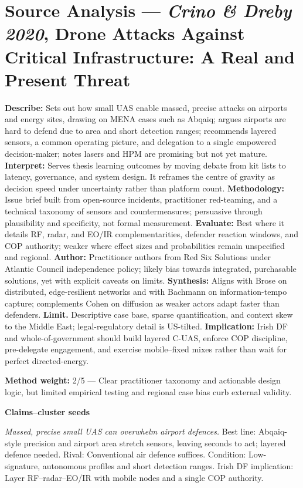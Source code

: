 \section*{Source Analysis — \textit{Crino \& Dreby 2020}, Drone Attacks Against Critical Infrastructure: A Real and Present Threat}
\textbf{Describe:} Sets out how small UAS enable massed, precise attacks on airports and energy sites, drawing on MENA cases such as Abqaiq; argues airports are hard to defend due to area and short detection ranges; recommends layered sensors, a common operating picture, and delegation to a single empowered decision-maker; notes lasers and HPM are promising but not yet mature.
\textbf{Interpret:} Serves thesis learning outcomes by moving debate from kit lists to latency, governance, and system design. It reframes the centre of gravity as decision speed under uncertainty rather than platform count.
\textbf{Methodology:} Issue brief built from open-source incidents, practitioner red-teaming, and a technical taxonomy of sensors and countermeasures; persuasive through plausibility and specificity, not formal measurement.
\textbf{Evaluate:} Best where it details RF, radar, and EO/IR complementarities, defender reaction windows, and COP authority; weaker where effect sizes and probabilities remain unspecified and regional.
\textbf{Author:} Practitioner authors from Red Six Solutions under Atlantic Council independence policy; likely bias towards integrated, purchasable solutions, yet with explicit caveats on limits.
\textbf{Synthesis:} Aligns with Brose on distributed, edge-resilient networks and with Bachmann on information-tempo capture; complements Cohen on diffusion as weaker actors adapt faster than defenders.
\textbf{Limit.} Descriptive case base, sparse quantification, and context skew to the Middle East; legal-regulatory detail is US-tilted.
\textbf{Implication:} Irish DF and whole-of-government should build layered C-UAS, enforce COP discipline, pre-delegate engagement, and exercise mobile–fixed mixes rather than wait for perfect directed-energy.

\textbf{Method weight:} 2/5 — Clear practitioner taxonomy and actionable design logic, but limited empirical testing and regional case bias curb external validity.

\textbf{Claims–cluster seeds}

\textit{Massed, precise small UAS can overwhelm airport defences.} Best line: Abqaiq-style precision and airport area stretch sensors, leaving seconds to act; layered defence needed. Rival: Conventional air defence suffices. Condition: Low-signature, autonomous profiles and short detection ranges. Irish DF implication: Layer RF–radar–EO/IR with mobile nodes and a single COP authority.

